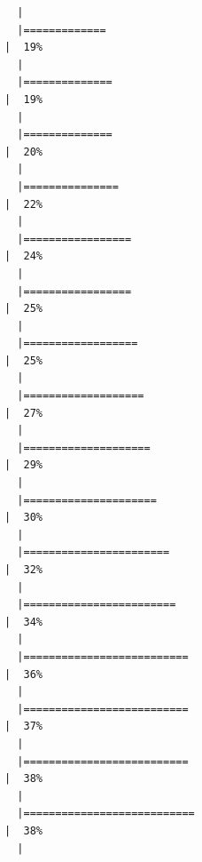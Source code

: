 \documentclass[
  letterpaper,
  DIV=11,
  numbers=noendperiod]{scrreprt}
\begin{document}
\begin{verbatim}
  |                                                                            
  |=============                                                         |  19%
  |                                                                            
  |==============                                                        |  19%
  |                                                                            
  |==============                                                        |  20%
  |                                                                            
  |===============                                                       |  22%
  |                                                                            
  |=================                                                     |  24%
  |                                                                            
  |=================                                                     |  25%
  |                                                                            
  |==================                                                    |  25%
  |                                                                            
  |===================                                                   |  27%
  |                                                                            
  |====================                                                  |  29%
  |                                                                            
  |=====================                                                 |  30%
  |                                                                            
  |=======================                                               |  32%
  |                                                                            
  |========================                                              |  34%
  |                                                                            
  |==========================                                            |  36%
  |                                                                            
  |==========================                                            |  37%
  |                                                                            
  |==========================                                            |  38%
  |                                                                            
  |===========================                                           |  38%
  |                                                                            

\end{verbatim}
\end{document}

